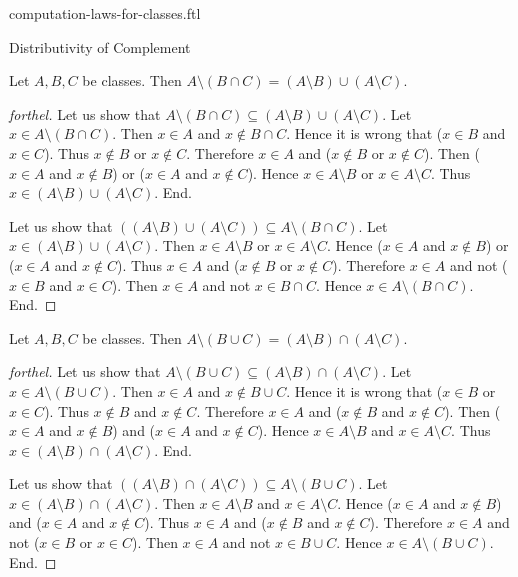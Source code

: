 \documentclass{naproche-library}
\begin{document}
\begin{smodule}[title=Computation Laws For Classes]{computation-laws-for-classes.ftl}
\begin{sfragment}{Distributivity of Complement}
  \begin{proposition}[forthel,id=FOUNDATIONS_02_5296031436636160]
    Let $A, B, C$ be classes.
    Then $A \setminus (B \cap C) = (A \setminus B) \cup (A \setminus C)$.
  \end{proposition}
  \begin{proof}[forthel]
    Let us show that $A \setminus (B \cap C) \subseteq (A \setminus B) \cup (A \setminus C)$.
      Let $x \in A \setminus (B \cap C)$.
      Then $x \in A$ and $x \notin B \cap C$.
      Hence it is wrong that ($x \in B$ and $x \in C$).
      Thus $x \notin B$ or $x \notin C$.
      Therefore $x \in A$ and ($x \notin B$ or $x \notin C$).
      Then ($x \in A$ and $x \notin B$) or ($x \in A$ and $x \notin C$).
      Hence $x \in A \setminus B$ or $x \in A \setminus C$.
      Thus $x \in (A \setminus B) \cup (A \setminus C)$.
    End.

    Let us show that $((A \setminus B) \cup (A \setminus C)) \subseteq A \setminus (B \cap C)$. %
      Let $x \in (A \setminus B) \cup (A \setminus C)$.
      Then $x \in A \setminus B$ or $x \in A \setminus C$.
      Hence ($x \in A$ and $x \notin B$) or ($x \in A$ and $x \notin C$).
      Thus $x \in A$ and ($x \notin B$ or $x \notin C$).
      Therefore $x \in A$ and not ($x \in B$ and $x \in C$).
      Then $x \in A$ and not $x \in B \cap C$.
      Hence $x \in A \setminus (B \cap C)$.
    End.
  \end{proof}

  \begin{proposition}[forthel,id=FOUNDATIONS_02_2909554153095168]
    Let $A, B, C$ be classes.
    Then $A \setminus (B \cup C) = (A \setminus B) \cap (A \setminus C)$.
  \end{proposition}
  \begin{proof}[forthel]
    Let us show that $A \setminus (B \cup C) \subseteq (A \setminus B) \cap (A \setminus C)$.
      Let $x \in A \setminus (B \cup C)$.
      Then $x \in A$ and $x \notin B \cup C$.
      Hence it is wrong that ($x \in B$ or $x \in C$).
      Thus $x \notin B$ and $x \notin C$.
      Therefore $x \in A$ and ($x \notin B$ and $x \notin C$).
      Then ($x \in A$ and $x \notin B$) and ($x \in A$ and $x \notin C$).
      Hence $x \in A \setminus B$ and $x \in A \setminus C$.
      Thus $x \in (A \setminus B) \cap (A \setminus C)$.
    End.

    Let us show that $((A \setminus B) \cap (A \setminus C)) \subseteq A \setminus (B \cup C)$. %
      Let $x \in (A \setminus B) \cap (A \setminus C)$.
      Then $x \in A \setminus B$ and $x \in A \setminus C$.
      Hence ($x \in A$ and $x \notin B$) and ($x \in A$ and $x \notin C$).
      Thus $x \in A$ and ($x \notin B$ and $x \notin C$).
      Therefore $x \in A$ and not ($x \in B$ or $x \in C$).
      Then $x \in A$ and not $x \in B \cup C$.
      Hence $x \in A \setminus (B \cup C)$.
    End.
  \end{proof}
\end{sfragment}


\end{smodule}
\end{document}
